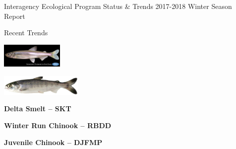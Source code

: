 \documentclass[]{article}\usepackage[]{graphicx}\usepackage[]{color}
\begin{document}
\newpage


\hypertarget{page:recenttrends}{}
\begin{Row}
  \begin{Cell}{1}
    \begin{center}
      {\Large Interagency Ecological Program Status \& Trends 2017-2018 Winter Season Report}
    \end{center}
  \end{Cell}
\end{Row}

\begin{Row}
  \begin{Cell}{1}
    \begin{center}
      {\Huge Recent Trends}
    \end{center}
  \end{Cell}
\end{Row}

\begin{Row}
  \begin{Cell}{1}
    \begin{center}
      \includegraphics[width=3cm,align=m]{figures/smelt/photo_delta_smelt.png}
    \end{center}
  \end{Cell}
  \begin{Cell}{1}
    \begin{center}
    \end{center}
  \end{Cell}  
  \begin{Cell}{1}
    \begin{center}
      \includegraphics[align=m]{figures/salmon/photo_salmon.png}
    \end{center}
  \end{Cell}
\end{Row}

\begin{Row}
  \begin{Cell}{1}
    \begin{center}
      {\bf {\large Delta Smelt – SKT}}
    \end{center}
  \end{Cell}
  \begin{Cell}{1}
    \begin{center}
      {\bf {\large Winter Run Chinook – RBDD}}
    \end{center}
  \end{Cell}  
  \begin{Cell}{1}
    \begin{center}
      {\bf {\large Juvenile Chinook – DJFMP}}
    \end{center}
  \end{Cell}
\end{Row}
\end{document}
